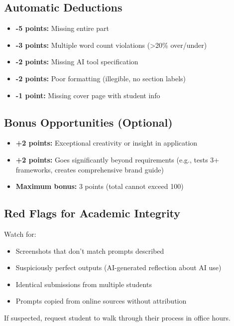 \documentclass[11pt]{article}
\begin{document}
\subsection*{Automatic Deductions}

\begin{itemize}
    \item \textbf{-5 points:} Missing entire part
    \item \textbf{-3 points:} Multiple word count violations (>20\% over/under)
    \item \textbf{-2 points:} Missing AI tool specification
    \item \textbf{-2 points:} Poor formatting (illegible, no section labels)
    \item \textbf{-1 point:} Missing cover page with student info
\end{itemize}

\subsection*{Bonus Opportunities (Optional)}

\begin{itemize}
    \item \textbf{+2 points:} Exceptional creativity or insight in application
    \item \textbf{+2 points:} Goes significantly beyond requirements (e.g., tests 3+ frameworks, creates comprehensive brand guide)
    \item \textbf{Maximum bonus:} 3 points (total cannot exceed 100)
\end{itemize}

\subsection*{Red Flags for Academic Integrity}

Watch for:
\begin{itemize}
    \item Screenshots that don't match prompts described
    \item Suspiciously perfect outputs (AI-generated reflection about AI use)
    \item Identical submissions from multiple students
    \item Prompts copied from online sources without attribution
\end{itemize}

If suspected, request student to walk through their process in office hours.
\end{document}
